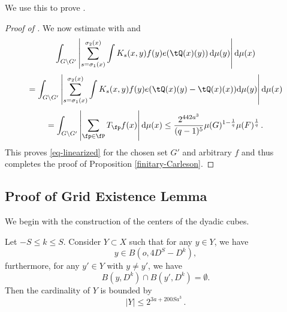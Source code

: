 We use this to prove .
\begin{proof}[Proof of ]
\leanok
We now estimate with  and 
\begin{equation}
 \int_{G \setminus G'} \left|\sum_{s={\sigma_1}(x)}^{{\sigma_2}(x)} \int K_s(x,y) f(y) e(\tQ(x)(y)) \, \mathrm{d}\mu(y)\right| \mathrm{d}\mu(x)
\end{equation}
\begin{equation}
 =\int_{G \setminus G'} \left|\sum_{s={\sigma_1}(x)}^{{\sigma_2}(x)} \int K_s(x,y) f(y) e(\tQ(x)(y) - \tQ(x)(x))\mathrm{d}\mu(y)\right| \mathrm{d}\mu(x)
\end{equation}
\begin{equation}
 =\int_{G \setminus G'} \left|\sum_{\fp\in \fP}T_{\fp} f(x)\right| \mathrm{d}\mu(x)
 \le \frac{2^{442a^3}}{(q-1)^5} \mu(G)^{1 - \frac{1}{q}} \mu(F)^{\frac{1}{q}} \,.
\end{equation}
This proves \eqref{eq-linearized} for the chosen set $G'$ and arbitrary $f$ and thus completes the proof of Proposition
\ref{finitary-Carleson}.
\end{proof}


\subsection{Proof of Grid Existence Lemma}
\label{subsecdyadic}

We begin with the construction of the centers of the dyadic cubes.
\begin{lemma}
    \label{counting-balls}
    \leanok
    Let $-S\le k\le S$. Consider $Y\subset X$ such that for any $y\in Y$, we have
    \begin{equation}\label{ybinb}
    y\in B(o,4D^S-D^k),
    \end{equation}
    furthermore, for any $y'\in Y$ with $y\neq y'$, we have
    \begin{equation} \label{eq-disj-yballs}
        B(y,D^k)\cap B(y',D^k)=\emptyset.
    \end{equation}
    Then the cardinality of $Y$ is bounded by
    \begin{equation}\label{boundY}
        |Y|\le 2^{3a + 200Sa^3}\, .
    \end{equation}
\end{lemma}


